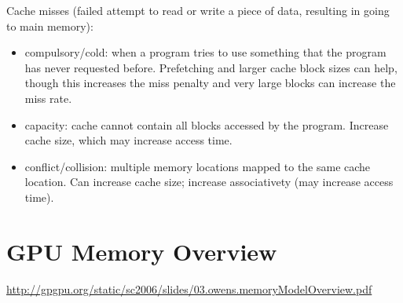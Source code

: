 \documentclass[12pt,twoside]{article}
\begin{document}
Cache misses (failed attempt to read or write a piece of data, resulting in going to main memory): 
\begin{itemize}
  \item compulsory/cold: when a program tries to use something that the program has never requested before. Prefetching and larger cache block sizes can help, though this increases the miss penalty and very large blocks can increase the miss rate.
  \item capacity: cache cannot contain all blocks accessed by the program. Increase cache size, which may increase access time. 
  \item conflict/collision: multiple memory locations mapped to the same cache location. Can increase cache size; increase associativety (may increase access time). 
\end{itemize}

\section*{GPU Memory Overview}
\href{http://gpgpu.org/static/sc2006/slides/03.owens.memoryModelOverview.pdf}{http://gpgpu.org/static/sc2006/slides/03.owens.memoryModelOverview.pdf}
\end{document}
